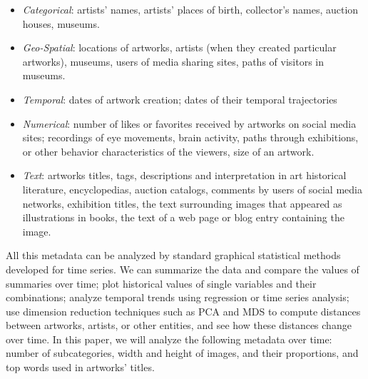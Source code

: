 \documentclass[letterpaper]{article}
\begin{document}
\begin{itemize}
\item \emph{Categorical}: artists’ names, artists’ places of birth, collector’s names, auction houses, museums. 
\item \emph{Geo-Spatial}: locations of artworks, artists (when they created particular artworks), museums, users of media sharing sites, paths of visitors in museums.
\item \emph{Temporal}: dates of artwork creation; dates of their temporal trajectories 
\item \emph{Numerical}: number of likes or favorites received by artworks on social media sites; recordings of eye movements, brain activity, paths through exhibitions, or other behavior characteristics of the viewers, size of an artwork.
\item \emph{Text}: artworks titles, tags, descriptions and interpretation in art historical literature, encyclopedias, auction catalogs, comments by users of social media networks, exhibition titles, the text surrounding images that appeared as illustrations in books, the text of a web page or blog entry containing the image. 
\end{itemize}


All this metadata can be analyzed by standard graphical statistical methods developed for time series. We can summarize the data and compare the values of summaries over time; plot historical values of single variables and their combinations; analyze temporal trends using regression or time series analysis; use dimension reduction techniques such as PCA and MDS to compute distances between artworks, artists, or other entities, and see how these distances change over time. 
	In this paper, we will analyze the following metadata over time: number of subcategories, width and height of images, and their proportions, and top words used in artworks’ titles.
\end{document}
